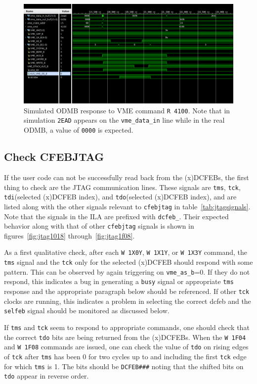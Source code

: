 \documentclass[10pt,a4paper]{article}
\begin{document}
\begin{figure}[H]
\centering
\includegraphics[width= 1.0 \textwidth]{figures/vmeexample.png}
\caption{Simulated ODMB response to VME command \texttt{R 4100}. Note that in simulation \texttt{2EAD} appears on the \texttt{vme\_data\_in} line while in the real ODMB, a value of \texttt{0000} is expected.}
\label{fig:vmecommand}
\end{figure}

\subsection{Check CFEBJTAG}

If the user code can not be successfully read back from the (x)DCFEBs, the first thing to check are the JTAG communication lines. These signals are \texttt{tms}, \texttt{tck}, \texttt{tdi}(selected (x)DCFEB index), and \texttt{tdo}(selected (x)DCFEB index), and are listed along with the other signals relevant to \texttt{cfebjtag} in table~\ref{tab:jtagsignals}. Note that the signals in the ILA are prefixed with \texttt{dcfeb\_}. Their expected behavior along with that of other \texttt{cfebjtag} signals is shown in figures~\ref{fig:jtag1018} through~\ref{fig:jtag1f08}.

As a first qualitative check, after each \texttt{W 1X0Y}, \texttt{W 1X1Y}, or \texttt{W 1X3Y} command, the \texttt{tms} signal and the \texttt{tck} only for the selected (x)DCFEB should respond with some pattern. This can be observed by again triggering on \texttt{vme\_as\_b}=0. If they do not respond, this indicates a bug in generating a \texttt{busy} signal or appropriate \texttt{tms} response and the appropriate paragraph below should be referenced. If other \texttt{tck} clocks are running, this indicates a problem in selecting the correct dcfeb and the \texttt{selfeb} signal should be monitored as discussed below.

If \texttt{tms} and \texttt{tck} seem to respond to appropriate commands, one should check that the correct \texttt{tdo} bits are being returned from the (x)DCFEBs. When the \texttt{W 1F04} and \texttt{W 1F08} commands are issued, one can check the value of \texttt{tdo} on rising edges of \texttt{tck} after \texttt{tms} has been 0 for two cycles up to and including the first \texttt{tck} edge for which \texttt{tms} is 1. The bits should be \texttt{DCFEB\#\#\#} noting that the shifted bits on \texttt{tdo} appear in reverse order.
\end{document}
